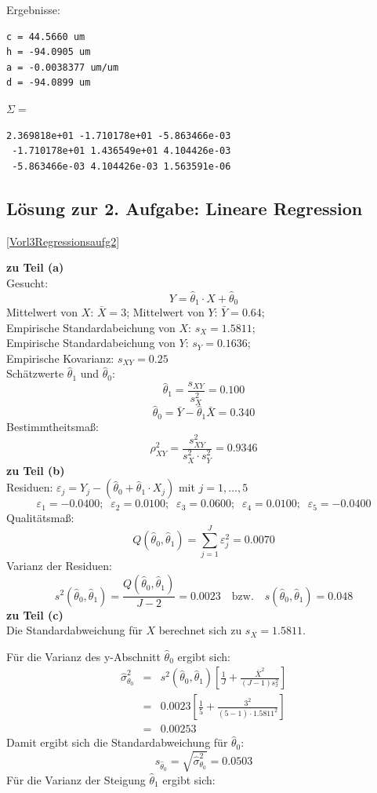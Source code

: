 Ergebnisse:
\begin{verbatim}
c = 44.5660 um
h = -94.0905 um
a = -0.0038377 um/um
d = -94.0899 um
\end{verbatim}

$\Sigma =$
\begin{verbatim}
2.369818e+01 -1.710178e+01 -5.863466e-03
 -1.710178e+01 1.436549e+01 4.104426e-03
 -5.863466e-03 4.104426e-03 1.563591e-06
\end{verbatim}



\subsection{Lösung zur 2. Aufgabe: Lineare Regression}
\ref{Vorl3Regressionsaufg2}

\textbf{zu Teil (a)} \\
Gesucht: 
\[
Y = \hat\theta_1 \cdot X + \hat \theta_0 
\]
Mittelwert von $X$: $\bar{X} = 3$; Mittelwert von $Y$: $\bar{Y} = 0.64$; \\
Empirische Standardabeichung von $X$: $s_X = 1.5811$; \\
Empirische Standardabeichung von $Y$: $s_Y = 0.1636$; \\
Empirische Kovarianz: $s_{XY} = 0.25$ \\
Schätzwerte $\hat{\theta}_1$ und $\hat{\theta}_0$:
\[
\hat{\theta}_1 = \frac{s_{XY} }{s_X^2 } = 0.100
\]
\[
\hat{\theta}_0 = \bar {Y} - \hat{\theta}_1 \bar {X} = 0.340
\]
Bestimmtheitsmaß:
\[
\rho_{XY}^2 = \frac{s_{XY}^2 }{s_X^2 \cdot s_Y^2 } = 0.9346
\]
\textbf{zu Teil (b)} \\
Residuen: $\varepsilon_j = Y_j -(\hat\theta _0 + \hat\theta _1 \cdot X_j)$
mit $j=1,\ldots ,5$
 \[\varepsilon_1 = -0.0400; \;\; \varepsilon_2 =  0.0100;\;\;
 \varepsilon_3= 0.0600;\;\; \varepsilon_4 =0.0100;\;\;
  \varepsilon_5 = -0.0400
 \]
Qualitätsmaß:
\[
Q(\hat\theta _0,\hat\theta _1) = \sum\limits_{j = 1}^J {\varepsilon_j ^2 } 
= 0.0070
\]
Varianz der Residuen:
\[
s^2(\hat{\theta}_0 ,\hat{\theta}_1 ) = \frac{Q(\hat{\theta}_0 ,
	\hat{\theta}_1 )}{J - 2} = 0.0023 \quad \text{bzw.} \quad
     s(\hat{\theta}_0 ,\hat{\theta}_1 ) = 0.048 
\]
\textbf{zu Teil (c)} \\
Die Standardabweichung für $X$ berechnet sich zu $s_X = 1.5811$.

Für die Varianz des y-Abschnitt $\hat\theta_0$ ergibt sich: 
\begin{eqnarray}
\hat\sigma_{\theta_0}^2 &=& s^2(\hat{\theta}_0 ,\hat{\theta}_1 )
\left[\frac{1}{J} + \frac{\bar{X}^2}{(J-1)s_x^2 } \right]
\nonumber \\ 
&=& 
0.0023
\left[\frac{1}{5} + \frac{3^2}{(5-1)\cdot 1.5811^2 } \right]
 \nonumber\\ 
&=& 0.00253 \nonumber
\end{eqnarray}
Damit ergibt sich die Standardabweichung für $\hat\theta_0$:
\[
s_{\hat\theta_0} = \sqrt{\hat\sigma_{\theta_0}^2} = 0.0503
\]
Für die Varianz der Steigung $\hat\theta_1$ ergibt sich: 

